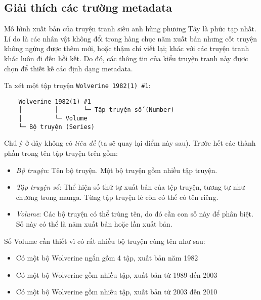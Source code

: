 \documentclass[../../../thesis]{subfiles}
\begin{document}
\begin{appendices}

\appendixpageoff


\chapter{Giải thích các trường metadata}\label{app:metadata}

Mô hình xuất bản của truyện tranh siêu anh hùng phương Tây là phức tạp nhất. Lí
do là các nhân vật không đổi trong hàng chục năm xuất bản nhưng cốt truyện không
ngừng được thêm mới, hoặc thậm chí viết lại; khác với các truyện tranh khác luôn
đi đến hồi kết. Do đó, các thông tin của kiểu truyện tranh này được chọn để
thiết kế các định dạng metadata.

Ta xét một tập truyện \texttt{Wolverine\ 1982(1)\ \#1}:

\begin{verbatim}
    Wolverine 1982(1) #1
    │         │       └─ Tập truyện số (Number)
    │         └─ Volume
    └─ Bộ truyện (Series)
\end{verbatim}

Chú ý ở đây không có \emph{tiêu đề} (ta sẽ quay lại điểm này sau). Trước hết các
thành phần trong tên tập truyện trên gồm:

\begin{itemize}
    \item
        \emph{Bộ truyện}: Tên bộ truyện. Một bộ truyện gồm nhiều tập truyện.
    \item
        \emph{Tập truyện số}: Thể hiện số thứ tự xuất bản của tệp truyện, tương
        tự như chương trong manga. Từng tập truyện lẻ còn có thể có tên riêng.
    \item
        \emph{Volume}: Các bộ truyện có thể trùng tên, do đó cần con số này để
        phân biệt. Số này có thể là năm xuất bản hoặc lần xuất bản.
\end{itemize}

Số Volume cần thiết vì có rất nhiều bộ truyện cùng tên như sau:

\begin{itemize}
    \item
        Có một bộ Wolverine ngắn gồm 4 tập, xuất bản năm 1982
    \item
        Có một bộ Wolverine gồm nhiều tập, xuất bản từ 1989 đến 2003
    \item
        Có một bộ Wolverine gồm nhiều tập, xuất bản từ 2003 đến 2010
\end{itemize}


\end{appendices}
\end{document}
